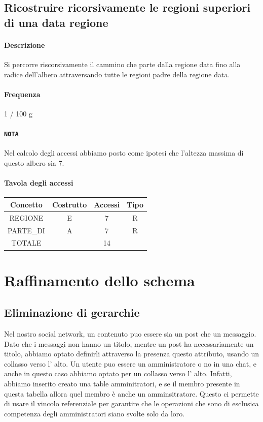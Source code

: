 \documentclass[a4paper,12pt]{report}
\begin{document}
\subsection{Ricostruire ricorsivamente le regioni superiori di una data regione} \label{aggiungere_regione}
\paragraph{Descrizione} Si percorre riscorsivamente il cammino che parte dalla regione data fino alla radice dell'albero attraversando tutte le regioni padre della regione data. 
\paragraph{Frequenza} 1 / 100 g
\paragraph{\texttt{NOTA}} Nel calcolo degli accessi abbiamo posto come ipotesi che l'altezza massima di questo albero sia 7. 
\begin{table}[H]
\paragraph{Tavola degli accessi\newline}
\begin{tabular}{|c|c|c|c|}
\hline
Concetto           & Costrutto  & Accessi    & Tipo       \\ \hline
REGIONE   & E & 7 & R \\ \hline
PARTE\_DI & A & 7 & R \\ \hline
TOTALE             &            & 14         &            \\ \hline
\end{tabular}
\end{table}
\section{Raffinamento dello schema}
\subsection{Eliminazione di gerarchie}
Nel nostro social network, un contenuto puo essere sia un 
post che un messaggio. Dato che i messaggi non hanno un titolo, mentre un post ha necessariamente un titolo, 
abbiamo optato definirli attraverso la presenza questo attributo, usando un collasso verso l' alto.
Un utente puo essere un amministratore o no in una chat, e anche in questo caso abbiamo optato per un collasso verso 
l' alto. Infatti, abbiamo inserito creato una table amminitratori, e se il membro presente in questa tabella allora quel membro è anche un amminsitratore. Questo ci permette di usare il vincolo referenziale per garantire che le operazioni che sono di esclusica competenza degli amministratori siano svolte solo da loro. 
\end{document}
